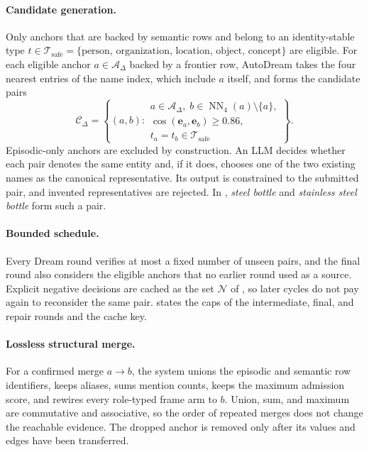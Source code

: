 \paragraph{Candidate generation.}
Only anchors that are backed by semantic rows and belong to an identity-stable
type \(t\in\mathcal T_{\mathrm{safe}}=\{\text{person, organization, location,
object, concept}\}\) are eligible. For each eligible anchor \(a\in\mathcal A_\Delta\) backed by a frontier row, AutoDream takes the four nearest entries of the name index, which include \(a\) itself,
and forms the candidate pairs
\begin{equation}
    \mathcal C_\Delta=
    \left\{
    (a,b):
    \begin{array}{l}
    a\in\mathcal A_\Delta,\;
    b\in\operatorname{NN}_4(a)\setminus\{a\},\\
    \cos(\mathbf e_a,\mathbf e_b)\ge 0.86,\\
    t_a=t_b\in\mathcal T_{\mathrm{safe}}
    \end{array}
    \right\}.
    \label{eq:dream-candidates}
\end{equation}
Episodic-only anchors are excluded by construction. An LLM decides whether each
pair denotes the same entity and, if it does, chooses one of the two existing
names as the canonical representative. Its output is constrained to the
submitted pair, and invented representatives are rejected. In
, \emph{steel bottle} and \emph{stainless steel
bottle} form such a pair.

\paragraph{Bounded schedule.}
Every Dream round verifies at most a fixed number of unseen pairs, and the
final round also considers the eligible anchors that no earlier round used as a
source. Explicit negative decisions are cached as the set \(\mathcal N\) of
, so later cycles do not pay again to reconsider the same pair.
 states the caps of the intermediate, final, and
repair rounds and the cache key.

\paragraph{Lossless structural merge.}
For a confirmed merge \(a\rightarrow b\), the system unions the episodic and
semantic row identifiers, keeps aliases, sums mention counts, keeps the maximum
admission score, and rewires every role-typed frame arm to \(b\). Union, sum, and maximum are commutative and
associative, so the order of repeated merges does not change the reachable
evidence. The dropped anchor is removed only after its values and edges have
been transferred.

